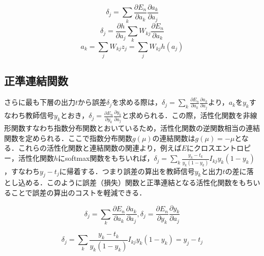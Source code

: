 \documentclass{jsarticle}
\begin{document}
\[
\delta_j = \sum_{k} \frac{\partial E_n}{\partial a_k} \frac{\partial a_k}{\partial a_j}
\]
\[
\delta_j = \frac{\partial h}{\partial a_j} \sum_k W_{kj} \frac{\partial E_n}{\partial a_k}
\]
\[
a_k=\sum_j W_{kj} z_{j} = \sum_j W_{kj} h(a_j)
\]

\subsection{正準連結関数}
\label{正準連結関数}

さらに最も下層の出力$t$から誤差$\delta_j$を求める際は，$\delta_j = \sum_k \frac{\partial E_n}{\partial a_k} \frac{\partial a_k}{\partial a_j}$より，$a_k$を$y_k$すなわち教師信号$y_k$とおき，$\delta_j = \frac{\partial E_n}{\partial y_k} \frac{\partial y_k}{\partial a_j}$と求められる．この際，活性化関数を非線形関数すなわち指数分布関数とおいているため，活性化関数の逆関数相当の連結関数を定められる．ここで指数分布関数$g(\mu)$の連結関数は$g(\mu)=-\mu$となる．これらの活性化関数と連結関数の関連より，例えば$E$にクロスエントロピー，活性化関数$h$にsoftmax関数をもちいれば，$\delta_j = \sum_k \frac{y_k-t_k}{y_k(1-y_k)} I_{kj} y_k (1-y_k)$，すなわち$y_j-t_j$に帰着する．つまり誤差の算出を教師信号$y_k$と出力$t$の差に落とし込める．このように誤差（損失）関数と正準連結となる活性化関数をもちいることで誤差の算出のコストを軽減できる．

\[
\delta_j = \sum_k \frac{\partial E_n}{\partial a_k} \frac{\partial a_k}{\partial a_j},
\delta_j = \frac{\partial E_n}{\partial y_k} \frac{\partial y_k}{\partial a_j}
\]

\[
\delta_j = \sum_k \frac{y_k-t_k}{y_k(1-y_k)} I_{kj} y_k (1-y_k) = y_j - t_j
\]
\end{document}
